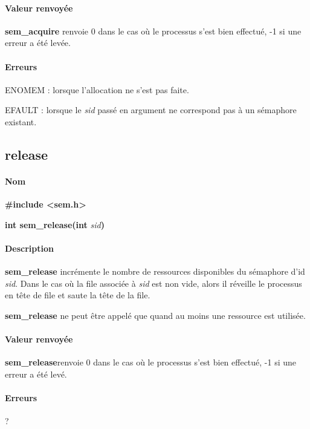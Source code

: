 \documentclass[12pt]{article}
\begin{document}
        \paragraph{Valeur renvoyée\\}
        \textbf{sem\_acquire} renvoie 0 dans le cas où le processus s'est bien effectué, -1 si une erreur a été levée.
        \paragraph{Erreurs\\}
        ENOMEM : lorsque l'allocation ne s'est pas faite.

        EFAULT : lorsque le \textit{sid} passé en argument ne correspond pas à un sémaphore existant.

    \newpage
    \subsection{release}
        \paragraph{Nom\\}
        \textbf{\#include <sem.h>}

        \textbf{int sem\_release(int }\textit{sid}\textbf{)}
        \paragraph{Description\\}
        \textbf{sem\_release} incrémente le nombre de ressources disponibles du sémaphore d'id \textit{sid}. Dans le cas où la file associée à \textit{sid} est non vide, alors il réveille le processus en tête de file et saute la tête de la file.

        \textbf{sem\_release} ne peut être appelé que quand au moins une ressource est utilisée.

        \paragraph{Valeur renvoyée\\}
        \textbf{sem\_release}renvoie 0 dans le cas où le processus s'est bien effectué, -1 si une erreur a été levé.
        \paragraph{Erreurs\\}
        ?
    \newpage
\end{document}
